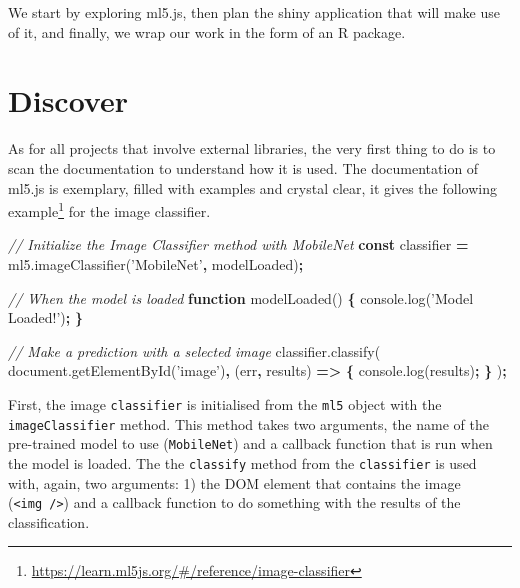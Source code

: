 \documentclass[10pt,]{krantz}
\makeatletter
\newenvironment{Shaded}{\begin{snugshade}}{\end{snugshade}}
\newcommand{\AttributeTok}[1]{\textcolor[rgb]{0.61,0.61,0.61}{#1}}
\newcommand{\CommentTok}[1]{\textcolor[rgb]{0.37,0.37,0.37}{\textit{#1}}}
\newcommand{\KeywordTok}[1]{\textcolor[rgb]{0.27,0.27,0.27}{\textbf{#1}}}
\newcommand{\NormalTok}[1]{#1}
\newcommand{\OperatorTok}[1]{\textcolor[rgb]{0.43,0.43,0.43}{\textbf{#1}}}
\newcommand{\StringTok}[1]{\textcolor[rgb]{0.5,0.5,0.5}{#1}}
\newcommand{\VariableTok}[1]{\textcolor[rgb]{0,0,0}{#1}}
\renewcommand{\href}[2]{#2\footnote{\url{#1}}}
\newenvironment{kframe}{%
\medskip{}
\setlength{\fboxsep}{.8em}
 \def\at@end@of@kframe{}%
 \ifinner\ifhmode%
  \def\at@end@of@kframe{\end{minipage}}%
  \begin{minipage}{\columnwidth}%
 \fi\fi%
 \def\FrameCommand##1{\hskip\@totalleftmargin \hskip-\fboxsep
 \colorbox{shadecolor}{##1}\hskip-\fboxsep
     \hskip-\linewidth \hskip-\@totalleftmargin \hskip\columnwidth}%
 \MakeFramed {\advance\hsize-\width
   \@totalleftmargin\z@ \linewidth\hsize
   \@setminipage}}%
 {\par\unskip\endMakeFramed%
 \at@end@of@kframe}
\renewenvironment{Shaded}{\begin{kframe}}{\end{kframe}}
\makeatother
\begin{document}
We start by exploring ml5.js, then plan the shiny application that will make use of it, and finally, we wrap our work in the form of an R package.

\hypertarget{shiny-complete-discover}{%
\section{Discover}\label{shiny-complete-discover}}

As for all projects that involve external libraries, the very first thing to do is to scan the documentation to understand how it is used. The documentation of ml5.js is exemplary, filled with examples and crystal clear, \href{https://learn.ml5js.org/\#/reference/image-classifier}{it gives the following example} for the image classifier.

\begin{Shaded}
\begin{Highlighting}[]
\CommentTok{// Initialize the Image Classifier method with MobileNet}
\KeywordTok{const}\NormalTok{ classifier }\OperatorTok{=} \VariableTok{ml5}\NormalTok{.}\AttributeTok{imageClassifier}\NormalTok{(}\StringTok{'MobileNet'}\OperatorTok{,}\NormalTok{ modelLoaded)}\OperatorTok{;}

\CommentTok{// When the model is loaded}
\KeywordTok{function} \AttributeTok{modelLoaded}\NormalTok{() }\OperatorTok{\{}
  \VariableTok{console}\NormalTok{.}\AttributeTok{log}\NormalTok{(}\StringTok{'Model Loaded!'}\NormalTok{)}\OperatorTok{;}
\OperatorTok{\}}

\CommentTok{// Make a prediction with a selected image}
\VariableTok{classifier}\NormalTok{.}\AttributeTok{classify}\NormalTok{(}
  \VariableTok{document}\NormalTok{.}\AttributeTok{getElementById}\NormalTok{(}\StringTok{'image'}\NormalTok{)}\OperatorTok{,}\NormalTok{ (err}\OperatorTok{,}\NormalTok{ results) }\KeywordTok{=>} \OperatorTok{\{}
    \VariableTok{console}\NormalTok{.}\AttributeTok{log}\NormalTok{(results)}\OperatorTok{;}
  \OperatorTok{\}}
\NormalTok{)}\OperatorTok{;}
\end{Highlighting}
\end{Shaded}

First, the image \texttt{classifier} is initialised from the \texttt{ml5} object with the \texttt{imageClassifier} method. This method takes two arguments, the name of the pre-trained model to use (\texttt{MobileNet}) and a callback function that is run when the model is loaded. The the \texttt{classify} method from the \texttt{classifier} is used with, again, two arguments: 1) the DOM element that contains the image (\texttt{\textless{}img\ /\textgreater{}}) and a callback function to do something with the results of the classification.
\end{document}
